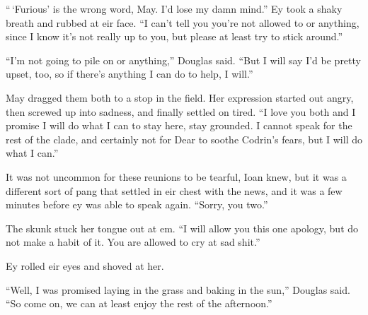 ``\,`Furious' is the wrong word, May. I'd lose my damn mind.'' Ey took a shaky breath and rubbed at eir face. ``I can't tell you you're not allowed to or anything, since I know it's not really up to you, but please at least try to stick around.''

``I'm not going to pile on or anything,'' Douglas said. ``But I will say I'd be pretty upset, too, so if there's anything I can do to help, I will.''

May dragged them both to a stop in the field. Her expression started out angry, then screwed up into sadness, and finally settled on tired. ``I love you both and I promise I will do what I can to stay here, stay grounded. I cannot speak for the rest of the clade, and certainly not for Dear to soothe Codrin's fears, but I will do what I can.''

It was not uncommon for these reunions to be tearful, Ioan knew, but it was a different sort of pang that settled in eir chest with the news, and it was a few minutes before ey was able to speak again. ``Sorry, you two.''

The skunk stuck her tongue out at em. ``I will allow you this one apology, but do not make a habit of it. You are allowed to cry at sad shit.''

Ey rolled eir eyes and shoved at her.

``Well, I was promised laying in the grass and baking in the sun,'' Douglas said. ``So come on, we can at least enjoy the rest of the afternoon.''
